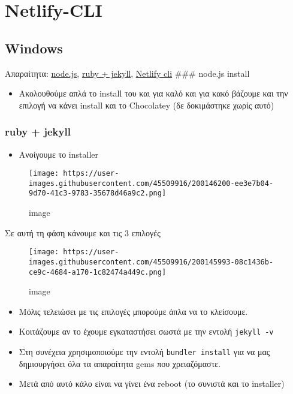 \hypertarget{netlify-cli}{%
\section{Netlify-CLI}\label{netlify-cli}}

\hypertarget{windows}{%
\subsection{Windows}\label{windows}}

Απαραίτητα: \href{https://nodejs.org/en/download/}{node.js},
\href{https://rubyinstaller.org/downloads/}{ruby + jekyll},
\href{https://cli.netlify.com/}{Netlify cli} \#\#\# node.js install

\begin{itemize}
\tightlist
\item
  Ακολουθούμε απλά το install του και για καλό και για κακό βάζουμε και
  την επιλογή να κάνει install και το Chocolatey (δε δοκιμάστηκε χωρίς
  αυτό)
\end{itemize}

\hypertarget{ruby-jekyll}{%
\subsubsection{ruby + jekyll}\label{ruby-jekyll}}

\begin{itemize}
\tightlist
\item
  Ανοίγουμε το installer
\end{itemize}

\begin{figure}
\centering
\texttt{[image: https://user-images.githubusercontent.com/45509916/200146200-ee3e7b04-9d70-41c3-9783-35678d46a9c2.png]}
\caption{image}
\end{figure}

Σε αυτή τη φάση κάνουμε και τις 3 επιλογές

\begin{figure}
\centering
\texttt{[image: https://user-images.githubusercontent.com/45509916/200145993-08c1436b-ce9c-4684-a170-1c82474a449c.png]}
\caption{image}
\end{figure}

\begin{itemize}
\tightlist
\item
  Μόλις τελειώσει με τις επιλογές μπορούμε άπλα να το κλείσουμε.
\item
  Κοιτάζουμε αν το έχουμε εγκαταστήσει σωστά με την εντολή
  \texttt{jekyll\ -v}
\item
  Στη συνέχεια χρησιμοποιούμε την εντολή \texttt{bundler\ install} για
  να μας δημιουργήσει όλα τα απαραίτητα gems που χρειαζόμαστε.
\item
  Μετά από αυτό κάλο είναι να γίνει ένα reboot (το συνιστά και το
  installer)
\end{itemize}

